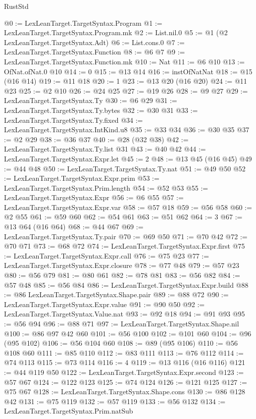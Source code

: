 \begin{lexlean}{RustStd}
\begin{coremodule}
@0 := LexLeanTarget.TargetSyntax.Program
@1 := LexLeanTarget.TargetSyntax.Program.mk
@2 := List.nil.{0}
@5 := @1 (@2 LexLeanTarget.TargetSyntax.Adt)
@6 := List.cons.{0}
@7 := LexLeanTarget.TargetSyntax.Function
@8 := @6 @7
@9 := LexLeanTarget.TargetSyntax.Function.mk
@10 := Nat
@11 := @6 @10
@13 := OfNat.ofNat.{0} @10
@14 := 0
@15 := @13 @14
@16 := instOfNatNat
@18 := @15 (@16 @14)
@19 := @11 @18
@20 := 1
@23 := @13 @20 (@16 @20)
@24 := @11 @23
@25 := @2 @10
@26 := @24 @25
@27 := @19 @26
@28 := @9 @27
@29 := LexLeanTarget.TargetSyntax.Ty
@30 := @6 @29
@31 := LexLeanTarget.TargetSyntax.Ty.bytes
@32 := @30 @31
@33 := LexLeanTarget.TargetSyntax.Ty.fixed
@34 := LexLeanTarget.TargetSyntax.IntKind.u8
@35 := @33 @34
@36 := @30 @35
@37 := @2 @29
@38 := @36 @37
@40 := @28 (@32 @38)
@42 := LexLeanTarget.TargetSyntax.Ty.list @31
@43 := @40 @42
@44 := LexLeanTarget.TargetSyntax.Expr.let
@45 := 2
@48 := @13 @45 (@16 @45)
@49 := @44 @48
@50 := LexLeanTarget.TargetSyntax.Ty.nat
@51 := @49 @50
@52 := LexLeanTarget.TargetSyntax.Expr.prim
@53 := LexLeanTarget.TargetSyntax.Prim.length
@54 := @52 @53
@55 := LexLeanTarget.TargetSyntax.Expr
@56 := @6 @55
@57 := LexLeanTarget.TargetSyntax.Expr.var
@58 := @57 @18
@59 := @56 @58
@60 := @2 @55
@61 := @59 @60
@62 := @54 @61
@63 := @51 @62
@64 := 3
@67 := @13 @64 (@16 @64)
@68 := @44 @67
@69 := LexLeanTarget.TargetSyntax.Ty.pair
@70 := @69 @50
@71 := @70 @42
@72 := @70 @71
@73 := @68 @72
@74 := LexLeanTarget.TargetSyntax.Expr.first
@75 := LexLeanTarget.TargetSyntax.Expr.call
@76 := @75 @23
@77 := LexLeanTarget.TargetSyntax.Expr.closure
@78 := @77 @48
@79 := @57 @23
@80 := @56 @79
@81 := @80 @61
@82 := @78 @81
@83 := @56 @82
@84 := @57 @48
@85 := @56 @84
@86 := LexLeanTarget.TargetSyntax.Expr.build
@88 := @86 LexLeanTarget.TargetSyntax.Shape.pair
@89 := @88 @72
@90 := LexLeanTarget.TargetSyntax.Expr.value
@91 := @90 @50
@92 := LexLeanTarget.TargetSyntax.Value.nat
@93 := @92 @18
@94 := @91 @93
@95 := @56 @94
@96 := @88 @71
@97 := LexLeanTarget.TargetSyntax.Shape.nil
@100 := @86 @97 @42 @60
@101 := @56 @100
@102 := @101 @60
@104 := @96 (@95 @102)
@106 := @56 @104 @60
@108 := @89 (@95 @106)
@110 := @56 @108 @60
@111 := @85 @110
@112 := @83 @111
@113 := @76 @112
@114 := @74 @113
@115 := @73 @114
@116 := 4
@119 := @13 @116 (@16 @116)
@121 := @44 @119 @50
@122 := LexLeanTarget.TargetSyntax.Expr.second
@123 := @57 @67
@124 := @122 @123
@125 := @74 @124
@126 := @121 @125
@127 := @75 @67
@128 := LexLeanTarget.TargetSyntax.Shape.cons
@130 := @86 @128 @42
@131 := @75 @119
@132 := @57 @119
@133 := @56 @132
@134 := LexLeanTarget.TargetSyntax.Prim.natSub

\end{coremodule}
\end{lexlean}

